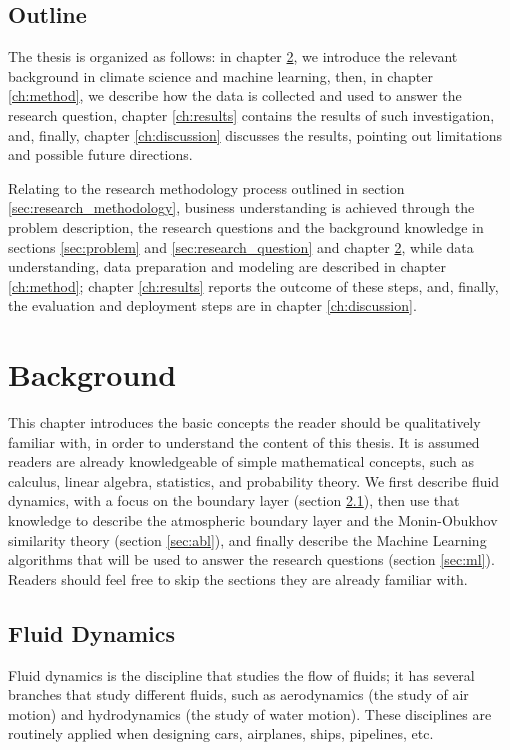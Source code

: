 \documentclass[a4paper]{book}
\begin{document}
\section{Outline}
The thesis is organized as follows: in chapter \ref{ch:background}, we introduce the relevant background in climate science and machine learning, then, in chapter \ref{ch:method}, we describe how the data is collected and used to answer the research question, chapter \ref{ch:results} contains the results of such investigation, and, finally, chapter \ref{ch:discussion} discusses the results, pointing out limitations and possible future directions.

Relating to the research methodology process outlined in section \ref{sec:research_methodology}, business understanding is achieved through the problem description, the research questions and the background knowledge in sections \ref{sec:problem} and \ref{sec:research_question} and chapter \ref{ch:background}, while data understanding, data preparation and modeling are described in chapter \ref{ch:method}; chapter \ref{ch:results} reports the outcome of these steps, and, finally, the evaluation and deployment steps are in chapter \ref{ch:discussion}.

\chapter{Background}
\label{ch:background}
This chapter introduces the basic concepts the reader should be qualitatively familiar with, in order to understand the content of this thesis. It is assumed readers are already knowledgeable of simple mathematical concepts, such as calculus, linear algebra, statistics, and probability theory. We first describe fluid dynamics, with a focus on the boundary layer (section \ref{sec:fluids}), then use that knowledge to describe the atmospheric boundary layer and the Monin-Obukhov similarity theory (section \ref{sec:abl}), and finally describe the Machine Learning algorithms that will be used to answer the research questions (section \ref{sec:ml}). Readers should feel free to skip the sections they are already familiar with.

\section{Fluid Dynamics}
\label{sec:fluids}
Fluid dynamics is the discipline that studies the flow of fluids; it has several branches that study different fluids, such as aerodynamics (the study of air motion) and hydrodynamics (the study of water motion). These disciplines are routinely applied when designing cars, airplanes, ships, pipelines, etc.
\end{document}
